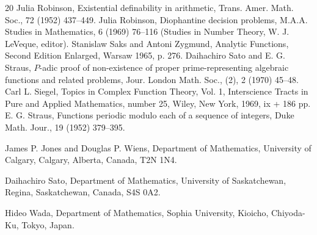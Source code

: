 \documentclass[10pt,letterpaper]{article}
\begin{document}
\begin{thebibliography}{20}
   Julia Robinson, Existential definability in arithmetic, Trans. Amer. Math. Soc., 72 (1952) 437--449.
   Julia Robinson, Diophantine decision problems, M.A.A. Studies in Mathematics, 6 (1969) 76--116 (Studies in Number Theory, W. J. LeVeque, editor).
   Stanislaw Saks and Antoni Zygmund, Analytic Functions, Second Edition Enlarged, Warsaw 1965, p. 276.
   Daihachiro Sato and E. G. Straus, $P$-adic proof of non-existence of proper prime-representing algebraic functions and related problems, Jour. London Math. Soc., (2), 2 (1970) 45--48.
   Carl L. Siegel, Topics in Complex Function Theory, Vol. 1, Interscience Tracts in Pure and Applied Mathematics, number 25, Wiley, New York, 1969, ix + 186 pp.
   E. G. Straus, Functions periodic modulo each of a sequence of integers, Duke Math. Jour., 19 (1952) 379--395.
\end{thebibliography}

James P. Jones and Douglas P. Wiens, Department of Mathematics, University of Calgary, Calgary, Alberta, Canada, T2N 1N4.

Daihachiro Sato, Department of Mathematics, University of Saskatchewan, Regina, Saskatchewan, Canada, S4S 0A2.

Hideo Wada, Department of Mathematics, Sophia University, Kioicho, Chiyoda-Ku, Tokyo, Japan.
\end{document}
